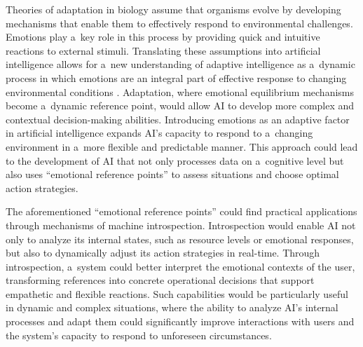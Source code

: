 Theories of adaptation in biology assume that organisms evolve by developing mechanisms that enable them to effectively respond to environmental challenges. Emotions play a~key role in this process by providing quick and intuitive reactions to external stimuli. Translating these assumptions into artificial intelligence allows for a~new understanding of adaptive intelligence as a~dynamic process in which emotions are an integral part of effective response to changing environmental conditions 
\parencites[][]{assuncao_emotional_2022}[][]{zhao_role_2022}. %
 Adaptation, where emotional equilibrium mechanisms become a~dynamic reference point, would allow AI to develop more complex and contextual decision-making abilities. Introducing emotions as an adaptive factor in artificial intelligence expands AI's capacity to respond to a~changing environment in a~more flexible and predictable manner. This approach could lead to the development of AI that not only processes data on a~cognitive level but also uses ``emotional reference points'' to assess situations and choose optimal action strategies.~



The aforementioned ``emotional reference points'' could find practical applications through mechanisms of machine introspection. Introspection would enable AI not only to analyze its internal states, such as resource levels or emotional responses, but also to dynamically adjust its action strategies in real-time. Through introspection, a~system could better interpret the emotional contexts of the user, transforming references into concrete operational decisions that support empathetic and flexible reactions. Such capabilities would be particularly useful in dynamic and complex situations, where the ability to analyze AI's internal processes and adapt them could significantly improve interactions with users and the system's capacity to respond to unforeseen circumstances.



